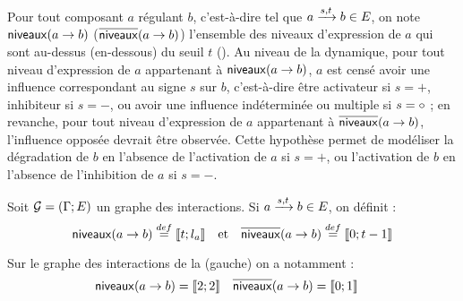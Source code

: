 Pour tout composant $a$ régulant $b$, c'est-à-dire tel que $a \xrightarrow{s, t} b \in E$,
on note $\mathsf{niveaux}(a\rightarrow b)$ (\resp $\overline{\mathsf{niveaux}}(a\rightarrow b)$) l'ensemble des niveaux d'expression
de $a$ qui sont au-dessus (\resp en-dessous) du seuil $t$ ().
Au niveau de la dynamique,
pour tout niveau d'expression de $a$ appartenant à $\mathsf{niveaux}(a\rightarrow b)$, $a$ est censé avoir
une influence correspondant au signe $s$ sur $b$,
c'est-à-dire être activateur si $s = +$, inhibiteur si $s = -$,
ou avoir une influence indéterminée ou multiple si $s = \circ$ ;
en revanche, pour tout niveau d'expression de $a$ appartenant à $\overline{\mathsf{niveaux}}(a\rightarrow b)$,
l'influence opposée devrait être observée.
Cette hypothèse permet de modéliser la dégradation de $b$ en l'absence de l'activation de $a$
si $s = +$, ou l'activation de $b$ en l'absence de l'inhibition de $a$ si $s = -$.

\begin{definition}
  Soit $\mathcal{G} = (\Gamma; E)$ un graphe des interactions.
  Si $a \xrightarrow{s, t} b \in E$, on définit :
    \[\mathsf{niveaux}(a\rightarrow b) \stackrel{def}= \mathopen{\llbracket}t\mathclose{};l_a\mathclose{\rrbracket} \quad \text{et} \quad
      \overline{\mathsf{niveaux}}(a\rightarrow b) \stackrel{def}= \mathopen{\llbracket}0\mathclose{};t-1\mathclose{\rrbracket}\]
\end{definition}

\begin{example}
  Sur le graphe des interactions de la (gauche)
  on a notamment :
  \begin{align*}
    \mathsf{niveaux}(a\rightarrow b) &= \mathopen{\llbracket}2\mathclose{};2\mathclose{\rrbracket} & \overline{\mathsf{niveaux}}(a\rightarrow b) &= \mathopen{\llbracket}0\mathclose{};1\mathclose{\rrbracket}
  \end{align*}
\end{example}

